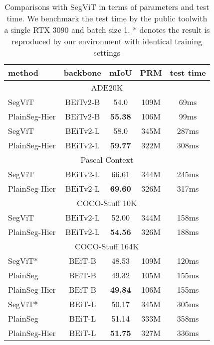 \documentclass{article} \usepackage{iclr2024_conference,times}
\begin{document}
\begin{table}[h]
\small
\begin{minipage}[c]{0.56\textwidth}
\caption{Comparisons with SegViT \citep{zhang2022segvit,zhang2023segvitv2} in terms of parameters and test time. We benchmark the test time by the public tool\protect\footnotemark[1] with a single RTX 3090 and batch size 1. $\ast$ denotes the result is reproduced by our environment with identical training settings}
\begin{center}
\label{tab:5}
\begin{tabular}{l|cccc}
\toprule
method   & backbone   &mIoU  & PRM  &test time \\\midrule
\multicolumn{5}{c}{ADE20K} \\ \midrule
SegViT  &BEiTv2-B  &54.0 &109M &  69ms\\
PlainSeg-Hier  &BEiTv2-B  &\textbf{55.38} &106M  & 99ms\\
SegViT  &BEiTv2-L  &58.0 &345M & 287ms \\
PlainSeg-Hier  &BEiTv2-L  &\textbf{59.77} &322M & 308ms \\\midrule\midrule
\multicolumn{5}{c}{Pascal Context} \\ \midrule
SegViT  &BEiTv2-L &66.61 &344M &245ms  \\
PlainSeg-Hier  &BEiTv2-L &\textbf{69.60}  &326M  &317ms \\\midrule\midrule
\multicolumn{5}{c}{COCO-Stuff 10K} \\ \midrule
SegViT  &BEiTv2-L &52.00 &344M   &158ms\\
PlainSeg-Hier  &BEiTv2-L &\textbf{54.56}  &326M &188ms  \\\midrule\midrule
\multicolumn{5}{c}{COCO-Stuff 164K} \\ \midrule
SegViT$\ast$   &BEiT-B &48.53 &109M  &120ms \\
PlainSeg &BEiT-B &49.32  &105M &155ms   \\
PlainSeg-Hier &BEiT-B &\textbf{49.84}  &106M &155ms   \\
SegViT$\ast$   &BEiT-L &50.17 &345M  &305ms  \\
PlainSeg &BEiT-L &51.14  &333M &358ms   \\
PlainSeg-Hier &BEiT-L &\textbf{51.75}  &327M &336ms   \\
\bottomrule
\end{tabular}
\end{center}
\end{minipage}
\hspace{.15in}
\begin{minipage}[c]{0.40\textwidth}

\end{minipage}
\end{table}
\end{document}
